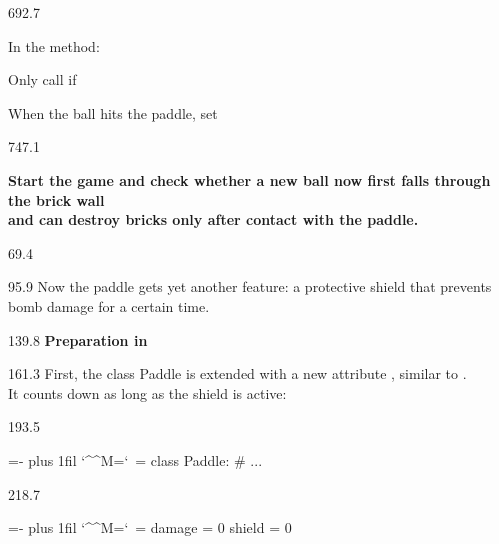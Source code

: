 \documentclass{aslab}
\makeatletter
\newcommand*\kw[1]{\textcolor{codeorange}{#1}}
\newcommand*\fn[1]{\textcolor{codecyan}{#1}}
\newcommand*\num[1]{\textcolor{codered}{#1}}
\newcommand*\cmt[1]{\textcolor{codepurple}{#1}}
\newenvironment{pycode}{\par\ttfamily\hyphenchar\font=-1
  \lineskiplimit=-\maxdimen\lineskip=0pt\parindent=0pt
  \parfillskip=0pt plus 1fil\relax
  \catcode`\^^M=\active\catcode`\ =\active\py@setup\py@gobble}{}
\newcommand*\emo[1]{\makebox[18bp][l]{\emoji{#1}}}
\makeatother
\begin{document}
\begin{region}[pitch=13.6]{692.7}
\begin{tasks}[start=2]
\item In the  method:
  \begin{bullets}
  \item Only call  if 
  \item When the ball hits the paddle, set 
  \end{bullets}
\end{tasks}
\end{region}

\begin{region}[pitch=14.2]{747.1}
{\bfseries\color{aslabblue}Start the game and check whether a new ball now
first falls through the brick wall\\
and can destroy bricks only after contact with the paddle.\par}
\end{region}

\nextpage
\begin{region}{69.4}
\end{region}

\begin{region}[pitch=13.2]{95.9}
Now the paddle gets yet another feature: a protective shield that prevents
bomb damage for a certain time.
\end{region}

\begin{region}{139.8}
\emo{1F9F1}\textbf{Preparation in} 
\end{region}

\begin{region}[pitch=13.3]{161.3}
First, the class Paddle is extended with a new attribute ,
similar to .\\
It counts down as long as the shield is active:
\end{region}

\begin{region}[pitch=13.2]{193.5}
\begin{pycode}
\kw{class} \fn{Paddle}:
    \cmt{\# ...}
\end{pycode}
\end{region}
\begin{region}[]{218.7}
\begin{pycode}
    damage = \num{0}
    shield = \num{0}
\end{pycode}
\end{region}
\end{document}
